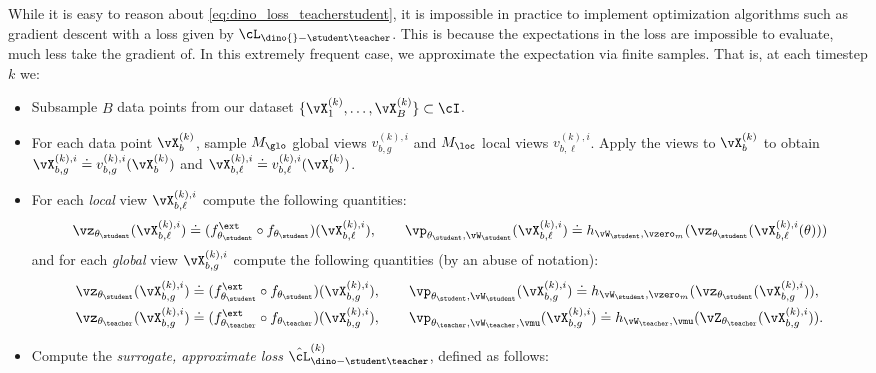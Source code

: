 \documentclass[../../book-main.tex]{subfiles}
\begin{document}
While it is easy to reason about \eqref{eq:dino_loss_teacherstudent}, it is impossible in practice to implement optimization algorithms such as gradient descent with a loss given by \(\cL_{\dino{}-\student\teacher}\). This is because the expectations in the loss are impossible to evaluate, much less take the gradient of. In this extremely frequent case, we approximate the expectation via finite samples. That is, at each timestep \(k\) we:
\begin{itemize}
    \item Subsample \(B\) data points from our dataset \(\{\vX_{1}^{(k)}, \dots, \vX_{B}^{(k)}\} \subset \cI\).
    \item For each data point \(\vX_{b}^{(k)}\), sample \(M_{\glo}\) global views \(v_{b, g}^{(k), i}\) and \(M_{\loc}\) local views \(v_{b, \ell}^{(k), i}\). Apply the views to \(\vX_{b}^{(k)}\) to obtain \(\vX_{b, g}^{(k), i} \doteq v_{b, g}^{(k), i}(\vX_{b}^{(k)})\) and \(\vX_{b, \ell}^{(k), i} \doteq v_{b, \ell}^{(k), i}(\vX_{b}^{(k)})\).
    \item For each \textit{local} view \(\vX_{b, \ell}^{(k), i}\) compute the following quantities:
    \begin{equation}
        \vz_{\theta_{\student}}(\vX_{b, \ell}^{(k), i}) \doteq (f_{\theta_{\student}}^{\ext} \circ f_{\theta_{\student}})(\vX_{b, \ell}^{(k), i}), \qquad \vp_{\theta_{\student}, \vW_{\student}}(\vX_{b, \ell}^{(k), i}) \doteq h_{\vW_{\student}, \vzero_{m}}(\vz_{\theta_{\student}}(\vX_{b, \ell}^{(k), i}(\theta)))
    \end{equation}
    and for each \textit{global} view \(\vX_{b, g}^{(k), i}\) compute the following quantities (by an abuse of notation):
    \begin{align}
        &\vz_{\theta_{\student}}(\vX_{b, g}^{(k), i}) \doteq (f_{\theta_{\student}}^{\ext} \circ f_{\theta_{\student}})(\vX_{b, g}^{(k), i}), \qquad \vp_{\theta_{\student}, \vW_{\student}}(\vX_{b, g}^{(k), i}) \doteq h_{\vW_{\student}, \vzero_{m}}(\vz_{\theta_{\student}}(\vX_{b, g}^{(k), i})), \\
        &\vz_{\theta_{\teacher}}(\vX_{b, g}^{(k), i}) \doteq (f_{\theta_{\teacher}}^{\ext} \circ f_{\theta_{\teacher}})(\vX_{b, g}^{(k), i}), \qquad \vp_{\theta_{\teacher}, \vW_{\teacher}, \vmu}(\vX_{b, g}^{(k), i}) \doteq h_{\vW_{\teacher}, \vmu}(\vZ_{\theta_{\teacher}}(\vX_{b, g}^{(k), i})).
    \end{align}
    \item Compute the \textit{surrogate, approximate loss} \(\hat{\cL}_{\dino-\student\teacher}^{(k)}\), defined as follows: 

\end{itemize}
\end{document}
